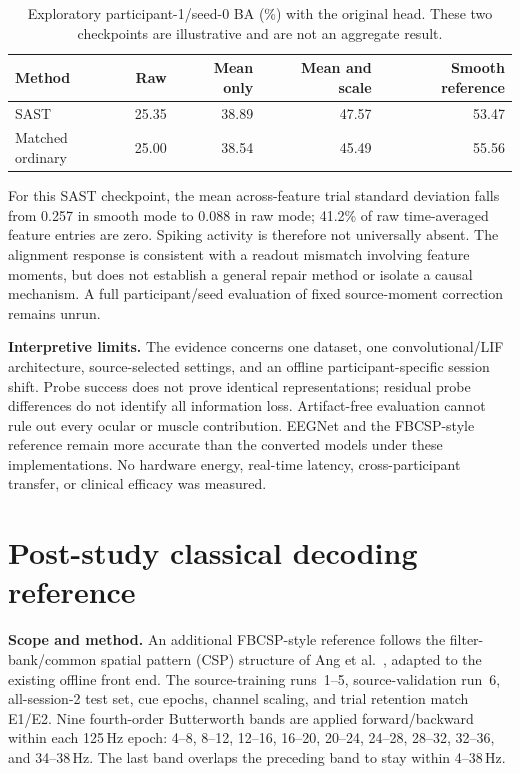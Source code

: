 \documentclass[11pt,a4paper]{article}
\begin{document}
\begin{table}[h]
\centering\small
\caption{Exploratory participant-1/seed-0 BA (\%) with the original head.
These two checkpoints are illustrative and are not an aggregate result.}
\begin{tabular}{lrrrr}
\toprule
Method & Raw & Mean only & Mean and scale & Smooth reference \\
\midrule
SAST & 25.35 & 38.89 & 47.57 & 53.47 \\
Matched ordinary & 25.00 & 38.54 & 45.49 & 55.56 \\
\bottomrule
\end{tabular}
\end{table}

For this SAST checkpoint, the mean across-feature trial standard deviation
falls from 0.257 in smooth mode to 0.088 in raw mode; 41.2\% of raw
time-averaged feature entries are zero. Spiking activity is therefore not
universally absent. The alignment response is consistent with a readout
mismatch involving feature moments, but does not establish a general repair
method or isolate a causal mechanism. A full participant/seed evaluation
of fixed source-moment correction remains unrun.

\textbf{Interpretive limits.} The evidence concerns one dataset, one
convolutional/LIF architecture, source-selected settings, and an offline
participant-specific session shift. Probe success does not prove identical
representations; residual probe differences do not identify all information
loss. Artifact-free evaluation cannot rule out every ocular or muscle
contribution. EEGNet and the FBCSP-style reference remain more accurate
than the converted models under these implementations.
No hardware energy, real-time latency, cross-participant transfer, or
clinical efficacy was measured.

\clearpage
\section{Post-study classical decoding reference}
\label{sec:fbcsp}

\textbf{Scope and method.} An additional FBCSP-style reference follows the
filter-bank/common spatial pattern (CSP) structure of Ang et al.\ \citep{ang}, adapted to the existing
offline front end. The source-training runs~1--5, source-validation run~6,
all-session-2 test set, cue epochs, channel scaling, and trial retention
match E1/E2. Nine fourth-order Butterworth bands are applied forward/backward
within each 125\,Hz epoch: 4--8, 8--12, 12--16, 16--20, 20--24, 24--28,
28--32, 32--36, and 34--38\,Hz. The last band overlaps the preceding band
to stay within 4--38\,Hz.
\end{document}
